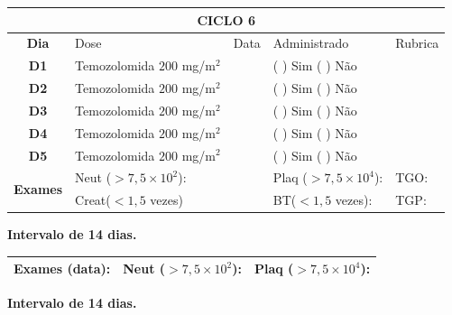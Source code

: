 \documentclass[11pt,a4paper,oldfontcommands]{memoir}
\begin{document}
\begin{center}
\begin{longtable}{p{1cm}p{4cm}|p{1cm}|p{4.6cm}|p{3cm}}
	\hline
	\multicolumn{5}{c}{\textbf{CICLO 6}}\\
\hline
    \multicolumn{1}{c|}{\multirow{1}{*}{\textbf{Dia}}}&{Dose}&{Data}&{Administrado}&{Rubrica} \\
    \hline
    \multicolumn{1}{c|}{\multirow{1}{*}{\textbf{D1}}}&{Temozolomida \(200\) mg/m\(^2\)}&&{(  ) Sim (  ) Não}&\\
    \multicolumn{1}{c|}{\multirow{1}{*}{\textbf{D2}}}&{Temozolomida \(200\) mg/m\(^2\)}&&{(  ) Sim (  ) Não}&\\
    \multicolumn{1}{c|}{\multirow{1}{*}{\textbf{D3}}}&{Temozolomida \(200\) mg/m\(^2\)}&&{(  ) Sim (  ) Não}&\\
    \multicolumn{1}{c|}{\multirow{1}{*}{\textbf{D4}}}&{Temozolomida \(200\) mg/m\(^2\)}&&{(  ) Sim (  ) Não}&\\
    \multicolumn{1}{c|}{\multirow{1}{*}{\textbf{D5}}}&{Temozolomida \(200\) mg/m\(^2\)}&&{(  ) Sim (  ) Não}&\\
    \hline
    \multicolumn{1}{c|}{\multirow{2}{*}{\textbf{Exames}}}&\multicolumn{2}{l|}{Neut (\(>7,5\times10^2\)):}&{Plaq (\(>7,5\times10^4\)):}&{TGO:}\\
    \cline{2-5}
    \multicolumn{1}{c|}{\multirow{2}{*}{{}}}&\multicolumn{2}{l|}{Creat(\(<1,5\) vezes)}&{BT(\(<1,5\) vezes):}&{TGP:}
    \\
    \hline
\end{longtable}
\textbf{Intervalo de 14 dias.}
\begin{longtable}{p{5cm}|p{5cm}|p{4.5cm}}
    \hline
    \textbf{Exames (data):}&{Neut (\(>7,5\times10^2\)):}&{Plaq (\(>7,5\times10^4\)):}
    \\
    \hline
\end{longtable}
\textbf{Intervalo de 14 dias.}
\end{center}
\clearpage
\end{document}
